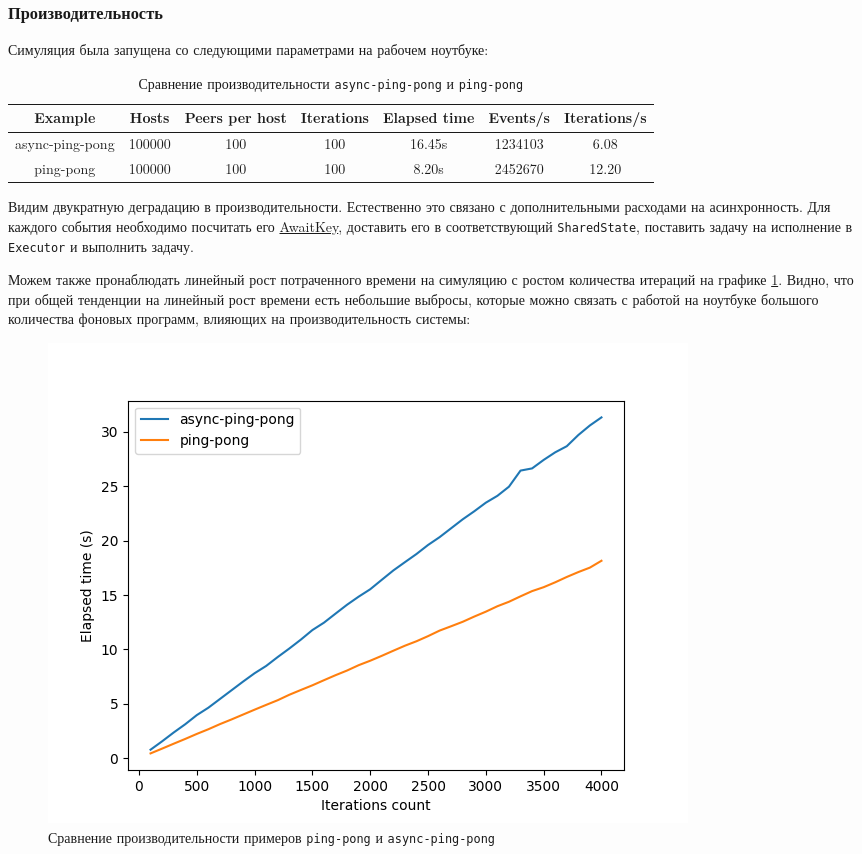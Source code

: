\subsubsection{Производительность}

Симуляция была запущена со следующими параметрами на рабочем ноутбуке:
\begin{table}[H]
    \centering
    \begin{tabular}{|c|c|c|c|c|c|c|}
        \hline
        Example & Hosts & Peers per host & Iterations & Elapsed time & Events/s & Iterations/s \\
        \hline
        async-ping-pong & 100000 & 100 & 100 & 16.45s & 1234103 & 6.08\\
        \hline
        ping-pong & 100000 & 100 & 100 & 8.20s & 2452670 & 12.20\\
        \hline
    \end{tabular}
    \caption{Сравнение производительности \texttt{async-ping-pong} и \texttt{ping-pong}}
    \label{cmp:ping-pong}
\end{table}

Видим двукратную деградацию в производительности. Естественно это связано с дополнительными расходами на асинхронность. Для каждого события необходимо посчитать его \hyperref[awaitkey]{AwaitKey}, доставить его в соответствующий \texttt{SharedState}, поставить задачу на исполнение в \texttt{Executor} и выполнить задачу.

Можем также пронаблюдать линейный рост потраченного времени на симуляцию с ростом количества итераций на графике \ref{async-perf}. Видно, что при общей тенденции на линейный рост времени есть небольшие выбросы, которые можно связать с работой на ноутбуке большого количества фоновых программ, влияющих на производительность системы:
\begin{figure}[H]
    \centering
    \includegraphics[width=0.9\linewidth]{images/async-ping-pong.png}
    \caption{Сравнение производительности примеров \texttt{ping-pong} и \texttt{async-ping-pong}}
    \label{async-perf}
\end{figure}

